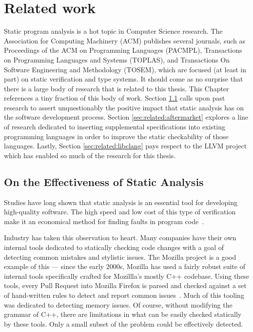 \chapter{Related work}\label{sec:related}

Static program analysis is a hot topic in Computer Science research.  The Association for Computing Machinery (ACM) publishes several journals, such as Proceedings of the ACM on Programming Languages (PACMPL), Transactions on Programming Languages and Systems (TOPLAS), and Transactions On Software Engineering and Methodology (TOSEM), which are focused (at least in part) on static verification and type systems.  It should come as no surprise that there is a large body of research that is related to this thesis.  This Chapter references a tiny fraction of this body of work.  Section \ref{sec:related:effectiveness} calls upon past research to assert unquestionably the positive impact that static analysis has on the software development process.  Section \ref{sec:related:aftermarket} explores a line of research dedicated to inserting supplemental specifications into existing programming languages in order to improve the static checkability of those languages.  Lastly, Section \ref{sec:related:libclang} pays respect to the LLVM project which has enabled so much of the research for this thesis.

\section{On the Effectiveness of Static Analysis}\label{sec:related:effectiveness}

Studies have long shown that static analysis is an essential tool for developing high-quality software.  The high speed and low cost of this type of verification make it an economical method for finding faults in program code~\cite{staticanal, static-anal-experience}.  

Industry has taken this observation to heart.  Many companies have their own internal tools dedicated to statically checking code changes with a goal of detecting common mistakes and stylistic issues.  The Mozilla project is a good example of this --- since the early 2000s, Mozilla has used a fairly robust suite of internal tools specifically crafted for Mozillla's mostly C++ codebase.  Using these tools, every Pull Request into Mozilla Firefox is parsed and checked against a set of hand-written rules to detect and report common issues~\cite{mozilla-pork-blog, moz-wiki-static-anal}.  Much of this tooling was dedicated to detecting memory issues.  Of course, without modifying the grammar of C++, there are limitations in what can be easily checked statically by these tools.  Only a small subset of the problem could be effectively detected.  


